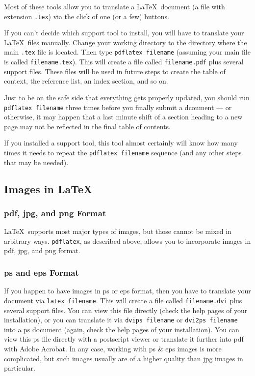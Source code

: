 \documentclass[12pt]{article}
\begin{document}
Most of these tools allow you to translate a \LaTeX\ document (a file with
extension {\tt .tex}) via the click of one (or a few) buttons.

If you can't decide which support tool to install, you will have to 
translate your \LaTeX\ files manually. Change your working directory
to the directory where the main {\tt .tex} file is located.
Then type \verb|pdflatex filename| (assuming your main file is
called {\tt filename.tex}). This will create a file called 
 {\tt filename.pdf} plus several support files. These files
will be used in future steps to create the table of context,
the reference list, an index section, and so on. 

Just to be on the safe side that everything gets properly updated, 
you should run \verb|pdflatex filename| three times before you
finally submit a dcoument --- or otherwise, it may happen that
a last minute shift of a section heading to a new page may not
be reflected in the final table of contents.

If you installed a support tool, this tool almost certainly will
know how many times it needs to repeat the \verb|pdflatex filename|
sequence (and any other steps that  may be needed).


\subsection{Images in \LaTeX}

\subsubsection{pdf, jpg, and png Format}

\LaTeX\ supports most major types of images, but those cannot be mixed
in arbitrary ways. {\tt pdflatex}, as described above, allows you to
incorporate images in pdf, jpg, and png format. 


\subsubsection{ps and eps Format}

If you happen to have images in ps or eps format, then you have
to translate your document via  \verb|latex filename|.
This will create a file called 
{\tt filename.dvi} plus several support files. You can view this
file directly (check the help pages of your installation),
or you can translate it via  \verb|dvips filename| or
 \verb|dvi2ps filename| into a ps document (again, check the help
pages of your installation). You can view this ps file
directly with a postscript viewer or translate it further into pdf
with Adobe Acrobat. In any case, working with ps \& eps
images is more complicated, but such images usually are of a
higher quality than jpg images in particular.
\end{document}
